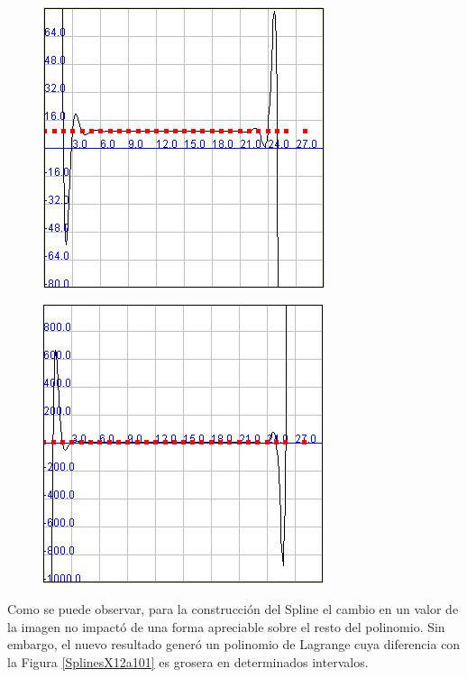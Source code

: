 \documentclass[a4paper]{article}
\begin{document}
\begin{figure}
	\caption{}
	\begin{center}
	\includegraphics[scale=1]{imagenes/LagrangeX12a101}
	\label{LagrangeX12a101}
  \end{center}
\end{figure}

\begin{figure}
	\caption{}
	\begin{center}
	\includegraphics[scale=1]{imagenes/LagrangeX12a101(zoomOut)}
	\label{LagrangeX12a101(zoomOut)}
  \end{center}
\end{figure}

Como se puede observar, para la construcción del Spline el cambio en un valor de la imagen no impactó de una forma apreciable sobre el resto del polinomio. Sin embargo, el nuevo resultado generó un polinomio de Lagrange cuya diferencia con la Figura \ref{SplinesX12a101} es grosera en determinados intervalos.\\ 
\end{document}

